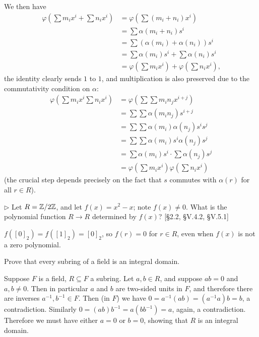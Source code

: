 \begin{solution}
	We then have
	\begin{align*}
		\varphi(\sum m_i x^i + \sum n_i x^i) &= \varphi(\sum (m_i + n_i) x^i) \\
		&= \sum \alpha(m_i + n_i) s^i \\
		&= \sum (\alpha(m_i) + \alpha(n_i)) s^i \\
		&= \sum \alpha(m_i) s^i + \sum \alpha(n_i) s^i \\
		&= \varphi(\sum m_i x^i) + \varphi(\sum n_i x^i) \text{,}
	\end{align*}
	the identity clearly sends $1$ to $1$, and multiplication is also preserved due to the commutativity condition on $\alpha$:
	\begin{align*}
		\varphi(\sum m_i x^i \sum n_i x^i) &= \varphi(\sum \sum m_i n_j x^{i+j}) \\
		&= \sum \sum \alpha(m_i n_j) s^{i+j} \\
		&= \sum \sum \alpha(m_i) \alpha(n_j) s^i s^j \\
		&= \sum \sum \alpha(m_i) s^i \alpha(n_j) s^j \\
		&= \sum \alpha(m_i) s^i \cdot \sum \alpha(n_j) s^j \\
		&= \varphi(\sum m_i x^i) \varphi(\sum n_i x^i)
	\end{align*}
	(the crucial step depends precisely on the fact that $s$ commutes with $\alpha(r)$ for all $r \in R$).
\end{solution}

\begin{problem}
	$\triangleright$ Let $R = \mathbb{Z}/2\mathbb{Z}$, and let $f(x) = x^2 - x$; note $f(x) \neq 0$. What is the polynomial function $R \to R$ determined by $f(x)$? [\S 2.2, \S V.4.2, \S V.5.1]
\end{problem}

\begin{solution}
	$f([0]_2) = f([1]_2) = [0]_2$, so $f(r) = 0$ for $r \in R$, even when $f(x)$ is not a zero polynomial.
\end{solution}

\begin{problem}
	Prove that every subring of a field is an integral domain.
\end{problem}

\begin{solution}
	Suppose $F$ is a field, $R \subseteq F$ a subring. Let $a, b \in R$, and suppose $ab = 0$ and $a, b \neq 0$. Then in particular $a$ and $b$ are two-sided units in $F$, and therefore there are inverses $a^{-1}, b^{-1} \in F$. Then (in $F$) we have $0 = a^{-1}(ab) = (a^{-1}a)b = b$, a contradiction. Similarly $0 = (ab)b^{-1} = a(bb^{-1}) = a$, again, a contradiction. Therefore we must have either $a = 0$ or $b = 0$, showing that $R$ is an integral domain.
\end{solution}


